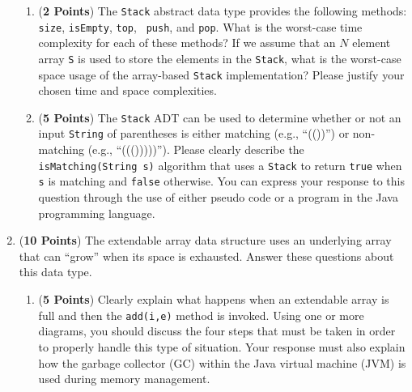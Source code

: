 \documentclass[12pt]{article}
\begin{document}
\begin{enumerate}
\begin{enumerate}
  \item ({\bf 2 Points}) The {\tt Stack} abstract data type provides
    the following methods: {\tt size}, {\tt isEmpty}, {\tt top}, {\tt
      push}, and {\tt pop}.  What is the worst-case time complexity
    for each of these methods?  If we assume that an $N$ element array
    {\tt S} is used to store the elements in the {\tt Stack}, what is
    the worst-case space usage of the array-based {\tt Stack}
    implementation?  Please justify your chosen time and space
    complexities.

    \item ({\bf 5 Points}) The {\tt Stack} ADT can be used to
      determine whether or not an input {\tt String} of parentheses is
      either matching (e.g., ``(())'') or non-matching (e.g.,
      ``((()))))'').  Please clearly describe the {\tt
        isMatching(String s)} algorithm that uses a {\tt Stack} to
      return {\tt true} when {\tt s} is matching and {\tt false}
      otherwise.  You can express your response to this question
      through the use of either pseudo code or a program in the Java
      programming language.

  \end{enumerate}

\newpage

\item ({\bf 10 Points}) The extendable array data structure uses an
  underlying array that can ``grow'' when its space is exhausted.
  Answer these questions about this data type.

  \begin{enumerate}

  \item ({\bf 5 Points}) Clearly explain what happens when an
    extendable array is full and then the {\tt add(i,e)} method is
    invoked. Using one or more diagrams, you should discuss the four
    steps that must be taken in order to properly handle this type of
    situation.  Your response must also explain how the garbage
    collector (GC) within the Java virtual machine (JVM) is used
    during memory management.



\end{enumerate}
\end{enumerate}
\end{document}
